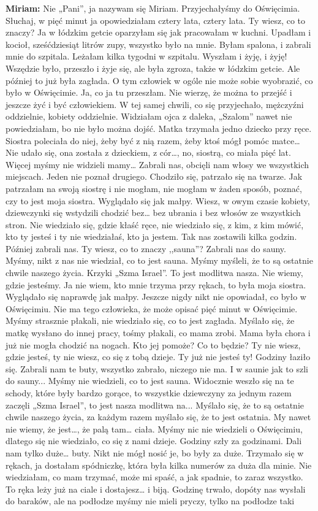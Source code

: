 \textbf{Miriam:} Nie „Pani”, ja nazywam się Miriam. Przyjechałyśmy do Oświęcimia. Słuchaj, w pięć minut ja opowiedziałam cztery lata, cztery lata. Ty wiesz, co to znaczy? Ja w łódzkim getcie oparzyłam się jak pracowałam w kuchni. Upadłam i kocioł, sześćdziesiąt litrów zupy, wszystko było na mnie. Byłam spalona, i zabrali mnie do szpitala. Leżałam kilka tygodni w szpitalu. Wyszłam i żyję, i żyję! Wszędzie było, przeszło i żyje się, ale była zgroza, także w łódzkim getcie. Ale później to już była zagłada. O tym człowiek w ogóle nie może sobie wyobrazić, co było w Oświęcimie. Ja, co ja tu przeszłam. Nie wierzę, że można to przejść i jeszcze żyć i być człowiekiem. W tej samej chwili, co się przyjechało, mężczyźni oddzielnie, kobiety oddzielnie. Widziałam ojca z daleka, „Szalom” nawet nie powiedziałam, bo nie było można dojść. Matka trzymała jedno dziecko przy ręce. Siostra poleciała do niej, żeby być z nią razem, żeby ktoś mógł pomóc matce… Nie udało się, ona została z dzieckiem, z cór…, no, siostrą, co miała pięć lat. Więcej myśmy nie widzieli mamy… Zabrali nas, obcięli nam włosy we wszystkich miejscach. Jeden nie poznał drugiego. Chodziło się, patrzało się na twarze. Jak patrzałam na swoją siostrę i nie mogłam, nie mogłam w żaden sposób, poznać, czy to jest moja siostra. Wyglądało się jak małpy. Wiesz, w owym czasie kobiety, dziewczynki się wstydzili chodzić bez… bez ubrania i bez włosów ze wszystkich stron. Nie wiedziało się, gdzie kłaść ręce, nie wiedziało się, z kim, z kim mówić, kto ty jesteś i ty nie wiedziałaś, kto ja jestem. Tak nas zostawili kilka godzin. Później zabrali nas. Ty wiesz, co to znaczy ,,sauna”? Zabrali nas do sauny. Myśmy, nikt z nas nie wiedział, co to jest sauna. Myśmy myśleli, że to są ostatnie chwile naszego życia. Krzyki „Szma Israel”. To jest modlitwa nasza. Nie wiemy, gdzie jesteśmy. Ja nie wiem, kto mnie trzyma przy rękach, to była moja siostra. Wyglądało się naprawdę jak małpy. Jeszcze nigdy nikt nie opowiadał, co było w Oświęcimiu. Nie ma tego człowieka, że może opisać pięć minut w Oświęcimie. Myśmy strasznie płakali, nie wiedziało się, co to jest zagłada. Myślało się, że matkę wysłano do innej pracy, tośmy płakali, co mama zrobi. Mama była chora i już nie mogła chodzić na nogach. Kto jej pomoże? Co to będzie? Ty nie wiesz, gdzie jesteś, ty nie wiesz, co się z tobą dzieje. Ty już nie jesteś ty! Godziny łaziło się. Zabrali nam te buty, wszystko zabrało, niczego nie ma. I w saunie jak to szli do sauny... Myśmy nie wiedzieli, co to jest sauna. Widocznie weszło się na te schody, które były bardzo gorące, to wszystkie dziewczyny za jednym razem zaczęli „Szma Israel”, to jest nasza modlitwa na... Myślało się, że to są ostatnie chwile naszego życia, za każdym razem myślało się, że to jest ostatnia. My nawet nie wiemy, że jest…, że palą tam… ciała. Myśmy nic nie wiedzieli o Oświęcimiu, dlatego się nie wiedziało, co się z nami dzieje. Godziny szły za godzinami. Dali nam tylko duże… buty. Nikt nie mógł nosić je, bo były za duże. Trzymało się w rękach, ja dostałam spódniczkę, która była kilka numerów za duża dla minie. Nie wiedziałam, co mam trzymać, może mi spaść, a jak spadnie, to zaraz wszystko. To ręka leży już na ciale i dostajesz… i biją. Godzinę trwało, dopóty nas wysłali do baraków, ale na podłodze myśmy nie mieli pryczy, tylko na podłodze taki 